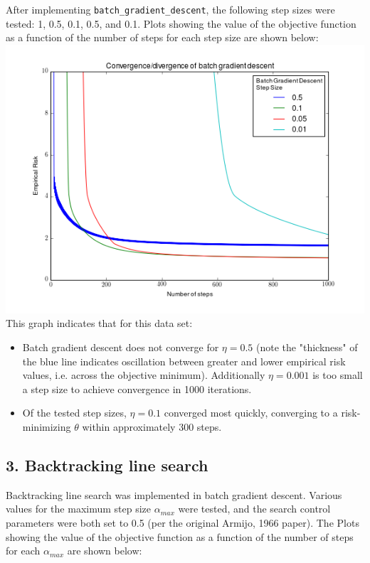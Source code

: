 \documentclass[paper=a4, fontsize=11pt]{scrartcl} %
\numberwithin{equation}{section} %
\numberwithin{figure}{section} %
\numberwithin{table}{section} %
\begin{document}
After implementing \texttt{batch\_gradient\_descent}, the following step sizes were tested: 1, 0.5, 0.1, 0.5, and 0.1. Plots showing the value of the objective function as a function of the number of steps for each step size are shown below: \\
\includegraphics[scale=.8]{./../figures/2_4_2.png} \\
This graph indicates that for this data set:
\begin{itemize}
\item  Batch gradient descent does not converge for $\eta = 0.5$ (note the "thickness" of the blue line indicates oscillation between greater and lower empirical risk values, i.e. across the objective minimum). Additionally $\eta = 0.001$ is too small a step size to achieve convergence in 1000 iterations.
\item Of the tested step sizes, $\eta = 0.1$ converged most quickly, converging to a risk-minimizing $\theta$ within approximately 300 steps.
\end{itemize}
 
 \subsection*{3. Backtracking line search}
 Backtracking line search was implemented in batch gradient descent. Various values for the maximum step size $\alpha_{max}$ were tested, and the search control parameters were both set to 0.5 (per the original Armijo, 1966 paper). The Plots showing the value of the objective function as a function of the number of steps for each $\alpha_{max}$ are shown below:
 
\end{document}
